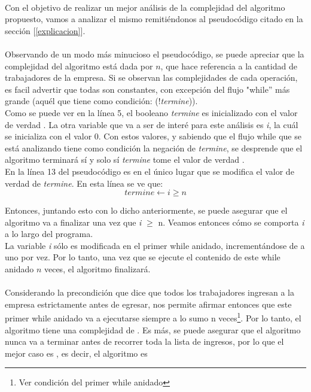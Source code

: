 \paragraph{}
Con el objetivo de realizar un mejor análisis de la complejidad del algoritmo propuesto, vamos a analizar el mismo remitiéndonos al pseudocódigo citado en la sección [\ref{explicacion}].

\paragraph{}
Observando de un modo más minucioso el pseudocódigo, se puede apreciar que la complejidad del algoritmo está dada por $n$, que hace referencia a la cantidad de trabajadores de la empresa. Si se observan las complejidades de cada operación, es facil advertir que todas son constantes, con excepción del flujo "while'' más grande (aquél que tiene como condición: (!\textit{termine})). \\
Como se puede ver en la línea 5, el booleano \textit{termine} es inicializado con el valor de verdad \false. La otra variable que va a ser de interé para este análisis es \textit{i}, la cuál se inicializa con el valor 0. Con estos valores, y sabiendo que el flujo while que se está analizando tiene como condición la negación de \textit{termine}, se desprende que el algoritmo terminará sí y solo sí \textit{termine} tome el valor de verdad \true. \\
En la línea 13 del pseudocódigo es en el único lugar que se modifica el valor de verdad de \textit{termine}. En esta línea se ve que:
	\begin{equation}
		termine \leftarrow i \geq n
	\end{equation}


Entonces, juntando esto con lo dicho anteriormente, se puede asegurar que el algoritmo va a finalizar una vez que \textit{i} \ensuremath{\geq} n. Veamos entonces cómo se comporta \textit{i} a lo largo del programa. \\
La variable \textit{i} sólo es modificada en el primer while anidado, incrementándose de a uno por vez. Por lo tanto, una vez que se ejecute el contenido de este while anidado $n$ veces, el algoritmo finalizará.

\paragraph{}
Considerando la precondición que dice que todos los trabajadores ingresan a la empresa estrictamente antes de egresar, nos permite afirmar entonces que este primer while anidado va a ejecutarse siempre a lo sumo n veces\footnote{Ver condición del primer while anidado}. Por lo tanto, el algoritmo tiene una complejidad de . Es más, se puede asegurar que el algoritmo nunca va a terminar antes de recorrer toda la lista de ingresos, por lo que el mejor caso es , es decir, el algoritmo es 

